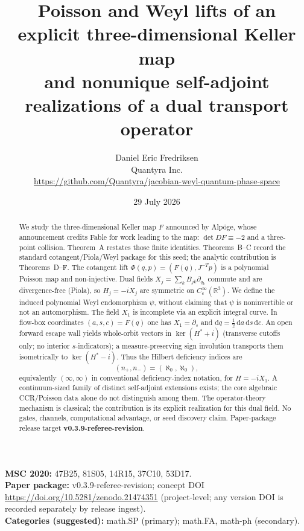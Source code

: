 ﻿\documentclass[11pt]{article}
\title{Poisson and Weyl lifts of an explicit three-dimensional Keller map\\
and nonunique self-adjoint realizations of a dual transport operator}
\author{Daniel Eric Fredriksen\\
Quantyra Inc.\\
\url{https://github.com/Quantyra/jacobian-weyl-quantum-phase-space}}
\date{29 July 2026}
\begin{document}
\maketitle

\begin{abstract}
We study the three-dimensional Keller map \(F\) announced by Alp\"oge, whose announcement credits Fable for work leading to the map: \(\det DF\equiv -2\) and a three-point collision. Theorem~A restates those finite identities. Theorems~B--C record the standard cotangent/Piola/Weyl package for this seed; the analytic contribution is Theorems~D--F. The cotangent lift \(\Phi(q,p)=(F(q),J^{-T}p)\) is a polynomial Poisson map and non-injective. Dual fields \(X_j=\sum_k B_{jk}\partial_{q_k}\) commute and are divergence-free (Piola), so \(H_j=-iX_j\) are symmetric on \(C_c^\infty(\mathbb{R}^3)\). We define the induced polynomial Weyl endomorphism \(\psi\), without claiming that \(\psi\) is noninvertible or not an automorphism. The field \(X_1\) is incomplete via an explicit integral curve. In flow-box coordinates \((a,s,c)=F(q)\) one has \(X_1=\partial_s\) and \(\mathrm{d}q=\tfrac12\,\mathrm{d}a\,\mathrm{d}s\,\mathrm{d}c\). An open forward escape wall yields whole-orbit vectors in \(\ker(H^*+i)\) (transverse cutoffs only; no interior \(s\)-indicators); a measure-preserving sign involution transports them isometrically to \(\ker(H^*-i)\). Thus the Hilbert deficiency indices are
\[
(n_+,n_-)=(\aleph_0,\aleph_0),
\]
equivalently \((\infty,\infty)\) in conventional deficiency-index notation, for \(H=-iX_1\). A continuum-sized family of distinct self-adjoint extensions exists; the core algebraic CCR/Poisson data alone do not distinguish among them. The operator-theory mechanism is classical; the contribution is its explicit realization for this dual field. No gates, channels, computational advantage, or seed discovery claim. Paper-package release target \textbf{v0.3.9-referee-revision}.
\end{abstract}

\noindent\textbf{MSC 2020:} 47B25, 81S05, 14R15, 37C10, 53D17.\\
\textbf{Paper package:} v0.3.9-referee-revision; concept DOI\\
\url{https://doi.org/10.5281/zenodo.21474351}
(project-level; any version DOI is recorded separately by release ingest).\\
\textbf{Categories (suggested):} math.SP (primary); math.FA, math-ph (secondary).
\end{document}
